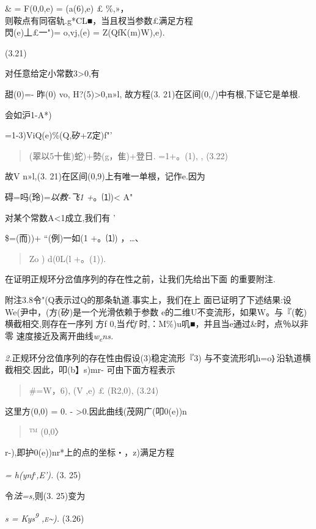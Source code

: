 \documentclass{article}
\begin{document}
\& = F(0,0,e) = (a(6),e) £ \%,»，\\
则鞍点有同宿轨.g*CL■，当且杈当参数£满足方程\\
閃(e)丄£一")= o,vj,(e) = Z(QfK(m)W),e).

(3.21)

对任意给定小常数3\textgreater{}0,有

甜(0)=- 昨(0) vo, H?(5)\textgreater{}0,n»l, 故方程(3.
21)在区间(0,/)中有根,下证它是单根.

会如沪1-A*)

=1-3)ViQ(e)\%(Q,矽+Z定)f"'

\begin{quote}
(翠以5十隹)蛇)+勢(g，隹)+登日. =1+。(1), , (3.22)
\end{quote}

故V n»l,(3. 21)在区间(0,9)上有唯一单根，记作e.因为

碍=吗(玲)=\emph{以教-飞1 +}。⑴)\textless{} A"

对某个常数A\textless{}1成立,我们有 '

\$=(而))+ ``(例)一如(1 +。⑴) ，\ldots{}、

\begin{quote}
Zo ) d(0L(l +。(1)).
\end{quote}

在证明正规环分岔值序列的存在性之前，让我们先给出下面 的重要附注.

附注3.8令"(Q表示过Q的那条轨道.事实上，我们在上
面已证明了下述结果:设We(尹中，(方(矽)是一个光滑依赖于参数
e的二维U不变流形，如果W。与『(乾)横截相交,则存在一序列 方f
0,当\emph{代f} 时,：M\%)u叽■，并且当e通过\&时，点％以非零
速度接近及离开曲线\emph{w\textsubscript{e}ns.}

\emph{2.}正规环分岔值序列的存在性由假设(3)稳定流形『3)
与不变流形叽h=o｝沿轨道横截相交.因此，叩(b】s)mr- 可由下面方程表示

\begin{quote}
\#=W，6), (V ,e) £ (R2,0), (3.24)
\end{quote}

这里方(0,0) = 0. - \textgreater{}0.因此曲线(茂网广(叩0(e))n

\begin{quote}
™ (0,0〉
\end{quote}

r-),即护0(e))nr*上的点的坐标・，z)满足方程

\emph{= h(ynf\textsuperscript{,},E').} (3. 25)

令\emph{法=s,}则(3. 25)变为

\emph{s = Kys\textsuperscript{9} \textsc{,e\textasciitilde{}).}} (3.26)
\end{document}
